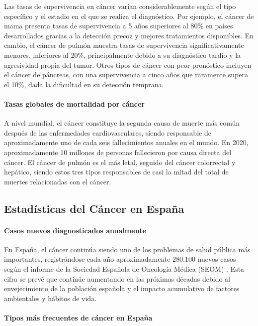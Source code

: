 Las tasas de supervivencia en cáncer varían considerablemente según el tipo específico y el estadio en el que se realiza el diagnóstico. Por ejemplo, el cáncer de mama presenta tasas de supervivencia a 5 años superiores al 80\% en países desarrollados gracias a la detección precoz y mejores tratamientos disponibles. En cambio, el cáncer de pulmón muestra tasas de supervivencia significativamente menores, inferiores al 20\%, principalmente debido a su diagnóstico tardío y la agresividad propia del tumor\cite{allemani2018global}. Otros tipos de cáncer con peor pronóstico incluyen el cáncer de páncreas, con una supervivencia a cinco años que raramente supera el 10\%, dada la dificultad en su detección temprana. 

\paragraph[short]{Tasas globales de mortalidad por cáncer}

A nivel mundial, el cáncer constituye la segunda causa de muerte más común después de las enfermedades cardiovasculares, siendo responsable de aproximadamente uno de cada seis fallecimientos anuales en el mundo. En 2020, aproximadamente 10 millones de personas fallecieron por causa directa del cáncer. El cáncer de pulmón es el más letal, seguido del cáncer colorrectal y hepático, siendo estos tres tipos responsables de casi la mitad del total de muertes relacionadas con el cáncer\cite{Sung2021}. 

\subsection{Estadísticas del Cáncer en España}
\label{sec:stats-cancer-spain}

\paragraph{Casos nuevos diagnosticados anualmente}

En España, el cáncer continúa siendo uno de los problemas de salud pública más importantes, registrándose cada año aproximadamente 280.100 nuevos casos según el informe de la Sociedad Española de Oncología Médica (SEOM)  \cite{SEOM2025}. Esta cifra se prevé que continúe aumentando en las próximas décadas debido al envejecimiento de la población española y el impacto acumulativo de factores ambientales y hábitos de vida. 

\paragraph{Tipos más frecuentes de cáncer en España} 

